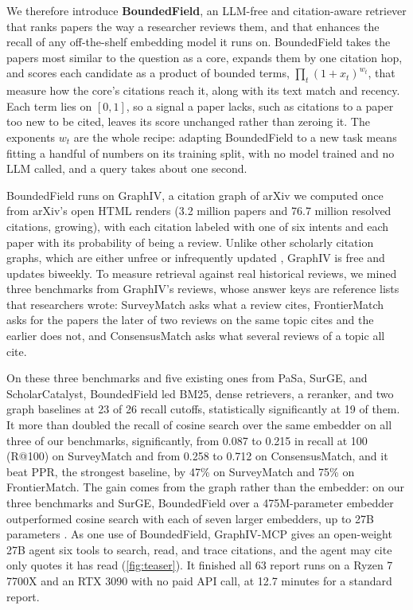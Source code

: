 We therefore introduce \textbf{BoundedField}, an LLM-free and citation-aware retriever that ranks papers the way a researcher reviews them, and that enhances the recall of any off-the-shelf embedding model it runs on. BoundedField takes the papers most similar to the question as a core, expands them by one citation hop, and scores each candidate as a product of bounded terms, $\prod_t (1+x_t)^{w_t}$, that measure how the core's citations reach it, along with its text match and recency. Each term lies on $[0,1]$, so a signal a paper lacks, such as citations to a paper too new to be cited, leaves its score unchanged rather than zeroing it. The exponents $w_t$ are the whole recipe: adapting BoundedField to a new task means fitting a handful of numbers on its training split, with no model trained and no LLM called, and a query takes about one second.

BoundedField runs on GraphIV, a citation graph of arXiv we computed once from arXiv's open HTML renders (3.2 million papers and 76.7 million resolved citations, growing), with each citation labeled with one of six intents and each paper with its probability of being a review. Unlike other scholarly citation graphs, which are either unfree or infrequently updated \citep{kinney2023s2,priem2022openalex,saier2023unarxive}, GraphIV is free and updates biweekly. To measure retrieval against real historical reviews, we mined three benchmarks from GraphIV's reviews, whose answer keys are reference lists that researchers wrote: SurveyMatch asks what a review cites, FrontierMatch asks for the papers the later of two reviews on the same topic cites and the earlier does not, and ConsensusMatch asks what several reviews of a topic all cite.

On these three benchmarks and five existing ones from PaSa, SurGE, and ScholarCatalyst, BoundedField led BM25, dense retrievers, a reranker, and two graph baselines at 23 of 26 recall cutoffs, statistically significantly at 19 of them. It more than doubled the recall of cosine search over the same embedder on all three of our benchmarks, significantly, from 0.087 to 0.215 in recall at 100 (R@100) on SurveyMatch and from 0.258 to 0.712 on ConsensusMatch, and it beat PPR, the strongest baseline, by 47\% on SurveyMatch and 75\% on FrontierMatch. The gain comes from the graph rather than the embedder: on our three benchmarks and SurGE, BoundedField over a 475M-parameter embedder outperformed cosine search with each of seven larger embedders, up to 27B parameters \citep{zhang2025qwen3embedding,microsoft2026harrier,nvidia2026nemotronembed}. As one use of BoundedField, GraphIV-MCP gives an open-weight 27B agent six tools to search, read, and trace citations, and the agent may cite only quotes it has read (\cref{fig:teaser}). It finished all 63 report runs on a Ryzen 7 7700X and an RTX 3090 with no paid API call, at 12.7 minutes for a standard report.

